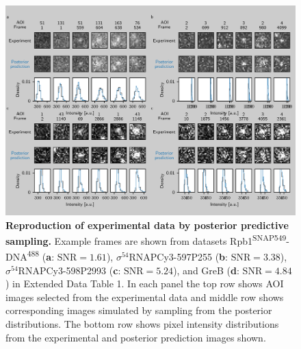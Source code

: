 \begin{figure}[h]
\centering
\includegraphics[width=\textwidth]{figures/figure4.png}
\caption{\textbf{Reproduction of experimental data by posterior predictive sampling.} Example frames are shown from datasets Rpb1\textsuperscript{SNAP549}-DNA\textsuperscript{488} (\textbf{a}: $\mathrm{SNR}=1.61$), $\sigma^{54}$RNAPCy3-597P255 (\textbf{b}: $\mathrm{SNR}=3.38$), $\sigma^{54}$RNAPCy3-598P2993 (\textbf{c}: $\mathrm{SNR}=5.24$), and GreB (\textbf{d}: $\mathrm{SNR}=4.84$) in Extended Data Table 1. In each panel the top row shows AOI images selected from the experimental data and middle row shows corresponding images simulated by sampling from the posterior distributions. The bottom row shows pixel intensity distributions from the experimental and posterior prediction images shown. }
\label{fig:posterior_samples}
\end{figure}
\clearpage
\newpage

